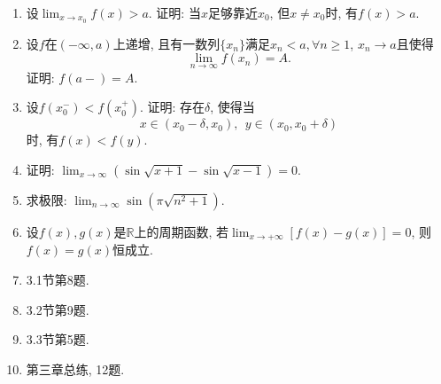 \documentclass[UTF8,11pt, a4paper, oneside, fontset=none]{ctexbook}
\begin{document}
\begin{enumerate}
\item 设$\lim_{x \to x_0}f(x) > a $. 证明: 当$x$足够靠近$x_0$, 但$x \neq x_0$时, 有$f(x) >a$.

\item 设$f$在$(-\infty, a)$上递增, 且有一数列$\{x_n\}$满足$x_n < a, \forall n \geq 1$, $x _n \to a$且使得
\[
\lim_{n \to \infty}f(x_n) =A.
\]
证明: $f(a-)=A$.

\item 设$f(x_0^-) < f(x_0^+)$. 证明: 存在$\delta$, 使得当
\[
x \in (x_0 - \delta, x_0), \ \ y \in (x_0, x_0 + \delta)
\]
时, 有$f(x) < f(y)$.

\item 证明: $\lim_{x \to \infty}(\sin \sqrt{x+1} - \sin \sqrt{x-1}) =0$.

\item 求极限: $\lim_{n \to \infty} \sin(\pi \sqrt{n^2+1})$.

\item 设$f(x), g(x)$是$\mathbb R$上的周期函数, 若$\lim_{x \to +\infty}[f(x) -g(x)] =0$, 则$f(x) = g(x)$恒成立.

\item 3.1节第8题.

\item 3.2节第9题.

\item 3.3节第5题.

\item 第三章总练, 12题.


\end{enumerate}
\end{document}
